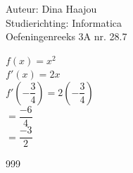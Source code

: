 \documentclass[a4paper]{article}
\begin{document}
\noindent \large Auteur: Dina Haajou \\
\noindent \large Studierichting: Informatica \\
\noindent \large Oefeningenreeks 3A nr. 28.7 \\

\medskip

\normalsize

$ f(x) = x^2 $ \\

$ f'(x) = 2x $ \\

$ f'\left(-\dfrac{3}{4}\right) = 2\left(-\dfrac{3}{4}\right) $ \\

$ = \dfrac{-6}{4} $ \\

$ = \dfrac{-3}{2} $ \\

\begin{thebibliography}{999}
\end{thebibliography}
\end{document}
